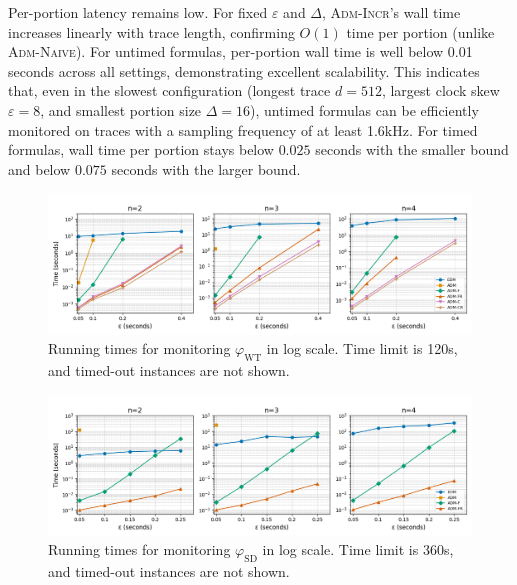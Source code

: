 Per-portion latency remains low.
For fixed $\varepsilon$ and $\Delta$, \textsc{Adm-Incr}'s wall time increases linearly with trace length, confirming  $O(1)$ time per portion (unlike \textsc{Adm-Naive}).
For untimed formulas, per-portion wall time is well below 0.01 seconds across all settings, demonstrating excellent scalability.
This indicates that, even in the slowest configuration (longest trace $d=512$, largest clock skew $\varepsilon=8$, and smallest portion size $\Delta=16$), untimed formulas can be efficiently monitored on traces with a sampling frequency of at least 1.6kHz.
For timed formulas, wall time per portion stays below $0.025$ seconds with the smaller bound and below $0.075$ seconds with the larger bound.

\begin{figure}[t]
	\begin{center}
		\includegraphics[width=\linewidth]{wt_newnames.png}
		\caption{Running times for monitoring $\varphi_{\text{WT}}$ in log scale. Time limit is 120s, and timed-out instances are not shown.}
	\end{center}
\end{figure}
\begin{figure}[t]
	\begin{center}
		\includegraphics[width=\linewidth]{ms_newnames.png}
		\caption{Running times for monitoring $\varphi_{\text{SD}}$ in log scale. Time limit is 360s, and timed-out instances are not shown.}
	\end{center}
\end{figure}

